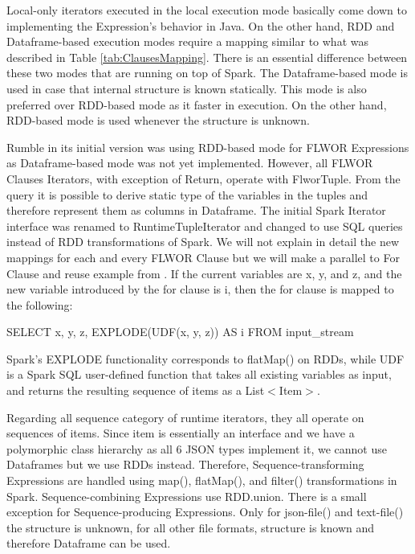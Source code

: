 Local-only iterators executed in the local execution mode basically come down to implementing the Expression's behavior in Java. On the other hand, RDD and Dataframe-based execution modes require a mapping similar to what was described in Table \ref{tab:ClausesMapping}. There is an essential difference between these two modes that are running on top of Spark. The Dataframe-based mode is used in case that internal structure is known statically. This mode is also preferred over RDD-based mode as it faster in execution. On the other hand, RDD-based mode is used whenever the structure is unknown. 

Rumble in its initial version was using RDD-based mode for FLWOR Expressions as Dataframe-based mode was not yet implemented. However, all FLWOR Clauses Iterators, with exception of Return, operate with FlworTuple. From the query it is possible to derive static type of the variables in the tuples and therefore represent them as columns in Dataframe. The initial Spark Iterator interface was renamed to RuntimeTupleIterator and changed to use SQL queries instead of RDD transformations of Spark. We will not explain in detail the new mappings for each and every FLWOR Clause but we will make a parallel to For Clause and reuse example from \cite{RumblePaper}. If the current variables are x, y, and z, and the new variable introduced by the for clause is i, then the for clause is mapped to the following:

SELECT x, y, z, EXPLODE(UDF(x, y, z)) AS i FROM input\_stream

Spark’s EXPLODE functionality corresponds to flatMap() on RDDs, while UDF is a Spark SQL user-defined function that takes all existing variables as input, and returns the resulting sequence of items as a List$<$Item$>$.

Regarding all sequence category of runtime iterators, they all operate on sequences of items. Since item is essentially an interface and we have a polymorphic class hierarchy as all 6 JSON types implement it, we cannot use Dataframes but we use RDDs instead. Therefore, Sequence-transforming Expressions are handled using map(), flatMap(), and filter() transformations in Spark. Sequence-combining Expressions use RDD.union. There is a small exception for Sequence-producing Expressions. Only for json-file() and text-file() the structure is unknown, for all other file formats, structure is known and therefore Dataframe can be used. 



